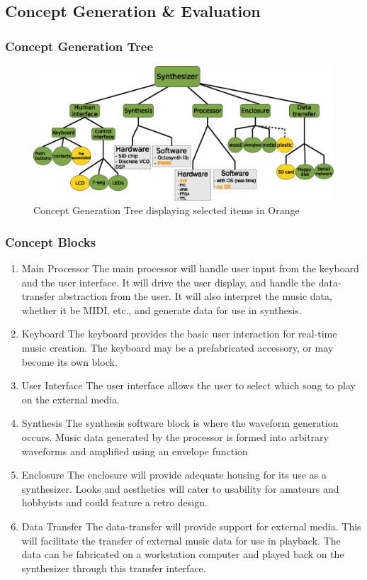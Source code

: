 \documentclass[bibtotocnumbered,abstract=on,paper=a4,fontsize=12pt,parskip=on,halfparskip=on]{scrartcl}		%
\begin{document}
  \subsection{Concept Generation \& Evaluation}  
    \subsubsection{Concept Generation Tree}
    \begin{figure}[H]
      \centering
      \includegraphics[width=\linewidth]{img/fig_concepttree}
        \caption{Concept Generation Tree displaying selected items in Orange}
    \end{figure}
    \subsubsection{Concept Blocks}
    \begin{enumerate}
        \item{Main Processor}
          The main processor will handle user input from the keyboard and the user interface. It will drive the user display, and handle the data-transfer abstraction from the user. It will also interpret the music data, whether it be MIDI, etc., and generate data for use in synthesis.
        \item{Keyboard}
          The keyboard provides the basic user interaction for real-time music creation. The keyboard may be a prefabricated accessory, or may become its own block.
        \item{User Interface}
          The user interface allows the user to select which song to play on the external media.
        \item{Synthesis}
          The synthesis software block is where the waveform generation occurs. Music data generated by the processor is formed into arbitrary waveforms and amplified using an envelope function\
        \item{Enclosure}
          The enclosure will provide adequate housing for its use as a synthesizer. Looks and aesthetics will cater to usability for amateurs and hobbyists and could feature a retro design.
        \item{Data Transfer}
          The data-transfer will provide support for external media. This will facilitate the transfer of external music data for use in playback. The data can be fabricated on a workstation computer and played back on the synthesizer through this transfer interface.
      \end{enumerate}
\end{document}
